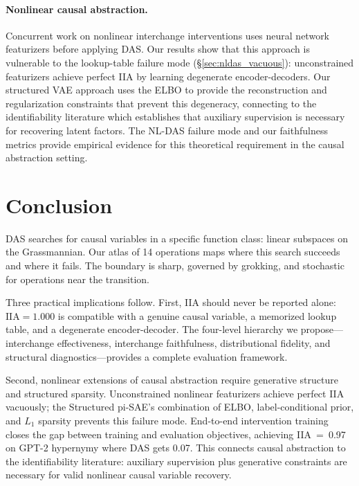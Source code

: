 \documentclass{article}
\newcommand{\IIA}{\mathrm{IIA}}
\begin{document}
\paragraph{Nonlinear causal abstraction.}
Concurrent work on nonlinear interchange interventions
\citep{geiger2024causal} uses neural network featurizers before applying DAS.
Our results show that this approach is vulnerable to the lookup-table failure
mode (\S\ref{sec:nldas_vacuous}): unconstrained featurizers achieve perfect IIA
by learning degenerate encoder-decoders. Our structured VAE approach uses the
ELBO to provide the reconstruction and regularization constraints that prevent
this degeneracy, connecting to the identifiability literature
\citep{khemakhem2020variational, sutter2020multimodal} which establishes that
auxiliary supervision is necessary for recovering latent factors. The NL-DAS
failure mode and our faithfulness metrics provide empirical evidence for this
theoretical requirement in the causal abstraction setting.


\section{Conclusion}
\label{sec:conclusion}

DAS searches for causal variables in a specific function class: linear subspaces
on the Grassmannian. Our atlas of 14 operations maps where this search succeeds
and where it fails. The boundary is sharp, governed by grokking, and stochastic
for operations near the transition.

Three practical implications follow. First, IIA should never be reported alone:
$\IIA = 1.000$ is compatible with a genuine causal variable, a memorized lookup
table, and a degenerate encoder-decoder. The four-level hierarchy we propose---interchange effectiveness, interchange faithfulness, distributional fidelity,
and structural diagnostics---provides a complete evaluation framework.

Second, nonlinear extensions of causal abstraction require generative structure
and structured sparsity. Unconstrained nonlinear featurizers achieve perfect IIA
vacuously; the Structured pi-SAE's combination of ELBO, label-conditional prior,
and $L_1$ sparsity prevents this failure mode. End-to-end intervention training
closes the gap between training and evaluation objectives, achieving IIA~=~0.97
on GPT-2 hypernymy where DAS gets 0.07. This connects causal abstraction to the
identifiability literature: auxiliary supervision plus generative constraints are
necessary for valid nonlinear causal variable recovery.
\end{document}
